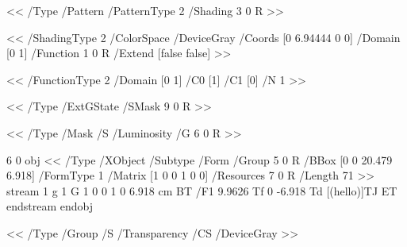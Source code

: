 <<
    /Type /Pattern
    /PatternType 2
    /Shading 3 0 R
>> 

<<
    /ShadingType 2
    /ColorSpace /DeviceGray
    /Coords [0 6.94444 0 0]     %
    /Domain [0 1]
    /Function 1 0 R
    /Extend [false false]
>> 

<<
    /FunctionType 2
    /Domain [0 1]
    /C0 [1]
    /C1 [0]
/N 1 >> 

<<
    /Type /ExtGState
    /SMask 9 0 R
>> 

<<
    /Type /Mask
    /S /Luminosity
    /G 6 0 R
>> 

6 0 obj                     %
<<
/Type /XObject
/Subtype /Form
/Group 5 0 R 
/BBox [0 0 20.479 6.918]
/FormType 1
/Matrix [1 0 0 1 0 0]
/Resources 7 0 R
/Length 71        
>>
stream
1 g 1 G
1 0 0 1 0 6.918 cm
BT
/F1 9.9626 Tf 0 -6.918 Td [(hello)]TJ
ET
endstream
endobj

<<
    /Type /Group
    /S /Transparency
    /CS /DeviceGray
>> 
\elisting

